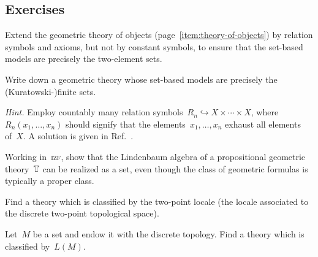 \documentclass{ws-rv9x6}
\begin{document}
{\subsection*{Exercises}

\begin{exercise}%
\begin{alphlist}[(c)]
\item Extend the geometric theory of objects
(page~\ref{item:theory-of-objects}) by relation symbols and axioms, but not by
constant symbols, to ensure that the set-based models are precisely the
two-element sets.
\item Write down a geometric theory whose set-based models are precisely the
(Kuratowski-)finite sets.\smallskip

{\scriptsize\emph{Hint.} Employ countably many relation symbols~$R_n
\hookrightarrow X \times \cdots \times X$, where~$R_n(x_1,\ldots,x_n)$ should
signify that the elements~$x_1,\ldots,x_n$ exhaust all elements of~$X$. A
solution is given in Ref.~\cite[Example~D1.1.7(k)]{johnstone:elephant}.\par}
\end{alphlist}
\end{exercise}

\begin{exercise}%
Working in~\textsc{izf}, show that the Lindenbaum algebra of a propositional
geometric theory~$\mathbb{T}$ can be realized as a set, even though the class of
geometric formulas is typically a proper class.\smallskip

\end{exercise}

\begin{exercise}%
\begin{alphlist}[(b)]
\item Find a theory which is classified by the two-point locale (the locale
associated to the discrete two-point topological space).
\item Let~$M$ be a set and endow it with the discrete topology. Find a theory
which is classified by~$L(M)$.
\end{alphlist}
\end{exercise}

}
\end{document}
